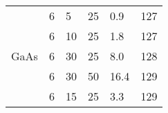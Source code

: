 \begin{table}[phtb]
\begin{center}
\begin{tabular}{p{1.5cm}lllll}
            \hline
                              & 6           & 5              & 25             & 0.9               & 127                        \\
                              & 6           & 10             & 25             & 1.8               & 127                        \\
            GaAs              & 6           & 30             & 25             & 8.0               & 128                        \\
                              & 6           & 30             & 50             & 16.4              & 129                        \\
                              & 6           & 15             & 25             & 3.3               & 129                        \\
            \hline
        \end{tabular}
    \end{center}
\end{table}
